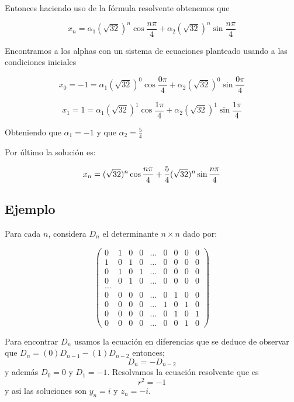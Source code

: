 \documentclass{report}
\begin{document}
  Entonces haciendo uso de la fórmula resolvente obtenemos que

  $$x_{n}=\alpha_{1}(\sqrt{32})^n\cos{\frac{n\pi}{4}} + \alpha_{2}(\sqrt{32})^n\sin{\frac{n\pi}{4}}$$

    Encontramos a los alphas con un sistema de ecuaciones planteado usando a las condiciones iniciales

    $$x_{0}=-1=\alpha_{1}(\sqrt{32})^0\cos{\frac{0\pi}{4}} + \alpha_{2}(\sqrt{32})^0\sin{\frac{0\pi}{4}}$$
      
     $$x_{1}=1=\alpha_{1}(\sqrt{32})^1\cos{\frac{1\pi}{4}} + \alpha_{2}(\sqrt{32})^1\sin{\frac{1\pi}{4}}$$

        Obteniendo que $\alpha_{1}=-1$ y que $\alpha_{2}=\frac{5}{4}$

        Por último la solución
 es:

         $$x_{n}=\-(\sqrt{32})^n\cos{\frac{n\pi}{4}} + \frac{5}{4}(\sqrt{32})^n\sin{\frac{n\pi}{4}}$$


\subsection{Ejemplo}

Para cada $n$, considera $D_{n}$ el determinante $n\times n$ dado por:

\begin{equation*}
\begin{pmatrix}
0 & 1 & 0 & 0 &\ldots & 0 & 0 & 0 & 0\\
1 & 0 & 1 & 0 &\ldots & 0 & 0 & 0 & 0\\
0 & 1 & 0 & 1 &\ldots & 0 & 0 & 0 & 0\\
0 & 0 & 1 & 0 &\ldots & 0 & 0 & 0 & 0\\
\ldots\\
0 & 0 & 0 & 0 &\ldots & 0 & 1 & 0 & 0\\
0 & 0 & 0 & 0 &\ldots & 1 & 0 & 1 & 0\\
0 & 0 & 0 & 0 &\ldots & 0 & 1 & 0 & 1\\
0 & 0 & 0 & 0 &\ldots & 0 & 0 & 1 & 0
\end{pmatrix}
\end{equation*}


Para encontrar $D_{n}$ usamos la ecuación en diferencias que se deduce de observar
que $D_{n}=(0)D_{n-1}-(1)D_{n-2}$ entonces;
\begin{equation}
  \label{determinante}
D_{n}=-D_{n-2}
\end{equation}
 y además $D_{0}=0$ y $D_{1}=-1$.
Resolvamos la ecuación resolvente que es $$r^{2}=-1$$ y asi las soluciones son $y_{n}=i$ y  $z_{n}=-i$.
\end{document}
